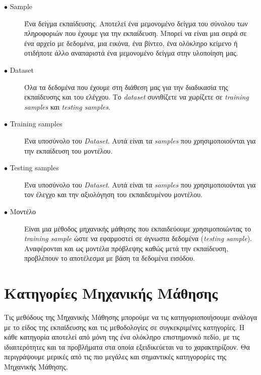 \begin{description}

\item[$\bullet$ Sample] Ένα δείγμα εκπαίδευσης. Αποτελεί ένα μεμονομένο δείγμα του σύνολου των πληροφοριών που έχουμε για την εκπαίδευση. Μπορεί να είναι μια σειρά σε ένα αρχείο με δεδομένα, μια εικόνα, ένα βίντεο, ένα ολόκληρο κείμενο ή οτιδήποτε άλλο αναπαριστά ένα μεμονομένο δείγμα στην υλοποίηση μας.

\item[$\bullet$ Dataset] Όλα τα δεδομένα που έχουμε στη διάθεση μας για την διαδικασία της εκπαίδευσης και του ελέγχου. Το \textit{dataset} συνιθίζετε να χωρίζετε σε \textit{training samples} και \textit{testing samples}. 

\item[$\bullet$ Training samples] Ένα υποσύνολο του \textit{Dataset}. Αυτά είναι τα \textit{samples} που χρησιμοποιούνται για την εκπαίδευση του μοντέλου. 

\item[$\bullet$ Testing samples] Ένα υποσύνολο του \textit{Dataset}. Αυτά είναι τα \textit{samples} που χρησιμοποιούνται για τον έλεγχο και την αξιολόγηση του εκπαιδευμένου μοντέλου. 

\item[$\bullet$ Μοντέλο] Είναι μια μέθοδος μηχανικής μάθησης που εκπαιδεύουμε χρησιμοποιώντας το \textit{training sample} ώστε να εφαρμοστεί σε άγνωστα δεδομένα (\textit{testing sample}). Αναφέρονται και ως μοντέλα πρόβλεψης καθώς μετά την εκπαίδευση, προβλέπουν το αποτέλεσμα με βάση τα δεδομένα εισόδου. 

\end{description}

\section{Κατηγορίες Μηχανικής Μάθησης}
Τις μεθόδους της Μηχανικής Μάθησης μπορούμε να τις κατηγοριοποιήσουμε ανάλογα με το είδος της εκπαίδευσης και τις μεθοδολογίες σε συγκεκριμένες κατηγορίες. Η κάθε κατηγορία αποτελεί από μόνη της ένα ολόκληρο επιστημονικό πεδίο, με τις ιδιαιτερότητες και τα προβλήματα στα οποία εξειδικεύεται να το χαρακτηρίζουν. Θα περιγράψουμε μερικές από τις πιο μεγάλες και σημαντικές κατηγορορίες της Μηχανικής Μάθησης.

